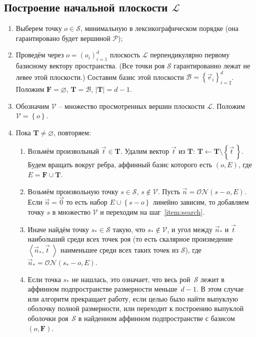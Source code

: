 \documentclass[a4paper,12pt]{article}
\newcommand{\Swarm}{\mathcal{S}}              %
\newcommand{\Polyhedron}{\mathcal{P}}         %
\newcommand{\Basis}{\mathcal{B}}              %
\newcommand{\Viewed}{\mathcal{V}}             %
\newcommand{\ZVec}{\vec 0}                    %
\newcommand{\set}[1]{\left\{ #1 \right\}}                    %
\newcommand{\scalprod}[2]{\left\langle #1, #2 \right\rangle} %
\newcommand{\ONorm}[3][]{\mathcal{ON}#1( #2, #3 #1)} %
\newcommand{\TempVec}{\mathbf{T}}  %
\newcommand{\FinalVec}{\mathbf{F}} %
\newcommand{\Plane}{\mathcal{L}}           %
\renewcommand{\.}{\hspace{0.2ex}}
\begin{document}
  \subsection{Построение начальной плоскости $\Plane$}
    \begin{enumerate}
      \item Выберем точку $o \in \Swarm$, минимальную в лексикографическом порядке (она гарантировано будет вершиной $\Polyhedron$);

      \item Проведём через $o=(o_i)_{i = 1}^{d}$ плоскость $\Plane$ перпендикулярно первому базисному вектору пространства. (Все точки роя $\Swarm$ гарантированно лежат не левее этой плоскости.) Составим базис этой плоскости $\Basis = \set{\vec e_i}_{i=2}^d$. Положим $\FinalVec = \varnothing$, $\TempVec = \Basis$, $|\TempVec| = d-1$.

      \item Обозначим $\Viewed$ -- множество просмотренных вершин плоскости $\Plane$. Положим $\Viewed =\set{o}$.

      \item Пока $\TempVec \neq \varnothing$, повторяем:

      \begin{enumerate}
        \item Возьмём произвольный $\vec t \in \TempVec$. Удалим вектор $\vec t$ из $\TempVec$: $\TempVec \leftarrow \TempVec \setminus \set{\vec t \,}$. Будем вращать вокруг ребра, аффинный базис которого есть $(o, E)$, где $E = \FinalVec \cup \TempVec$.

        \item Возьмём произвольную точку $s \in \Swarm$, $s \notin \Viewed$. Пусть $\vec n = \ONorm{s - o}{E}$. Если $\vec n = \ZVec$ то есть набор $E \cup \set{s - o}$ линейно зависим, то добавляем точку $s$ в множество $\Viewed$ и переходим на шаг~\ref{item:search}.
        \label{item:search}

        \item Иначе найдём точку $s_* \in \Swarm$ такую, что $s_* \notin \Viewed$, и угол между $\vec n_*$ и $\vec t$ наибольший среди всех точек роя (то есть скалярное произведение $\scalprod{\vec n_*}{\vec t \;}$ наименьшее среди всех таких точек из $\Swarm$), где $\vec n_* = \ONorm{s_* - o}{E}$.

        \item Если точка $s_*$ не нашлась, это означает, что весь рой~$\Swarm$ лежит в аффинном подпространстве размерности меньше~$d-1$. В этом случае или алгоритм прекращает работу, если целью было найти выпуклую оболочку полной размерности, или переходит к построению выпуклой оболочки роя~$\Swarm$ в найденном аффинном подпространстве с базисом $(o, \FinalVec)$.


\end{enumerate}
\end{enumerate}
\end{document}
